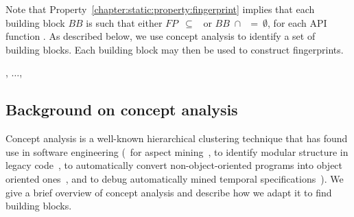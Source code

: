 Note that Property~\ref{chapter:static:property:fingerprint} implies that each
building block $BB$ is such that either $FP$~$\subseteq$~ or
$BB$~$\cap$~~=~$\emptyset$, for each API function
.  As described below, we use concept analysis to identify a set
of building blocks. Each building block may then be used to construct
fingerprints.

\linesnumbered
\begin{algorithm}[ht!]
%
\SetVline
{}
%
%
%
%
%
\Return {}, $\ldots$, 
\end{algorithm}

\subsection{Background on concept analysis}
%
Concept analysis is a well-known hierarchical clustering technique that has
found use in software engineering (\eg~for aspect
mining~\cite{cmm+05,eks03,tc04,tm04}, to identify modular structure in legacy
code~\cite{ls97,s98,st98,vk99}, to automatically convert non-object-oriented
programs into object oriented ones~\cite{s98}, and to debug automatically mined
temporal specifications~\cite{amb+03}).  We give a brief overview of concept
analysis and describe how we adapt it to find building blocks.

